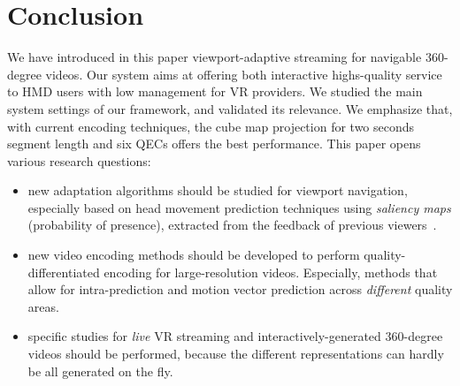 \section{Conclusion}
\label{sec:conclusion}

We have introduced in this paper viewport-adaptive streaming for
navigable $360$-degree videos. Our system aims at offering both
interactive highs-quality service to \ac{HMD} users with low management
for \ac{VR} providers.
We studied the main system
settings of our framework, and validated its relevance.
We emphasize that, with current encoding techniques, the cube
map projection for two seconds segment length and six
\acp{QEC} offers the best performance. This
paper opens various research questions:
\begin{itemize}
  \item new adaptation algorithms should be studied for viewport navigation,
especially based on head movement prediction techniques using \emph{saliency maps} (probability of
presence), extracted from the feedback of
previous viewers~\cite{han2014spatial}.

  \item new video encoding methods should be
developed to perform quality-differentiated encoding for
large-resolution videos. Especially, methods that allow for
intra-prediction and motion vector prediction across \emph{different} quality
areas.
\item specific studies for \emph{live} \ac{VR} streaming
and interactively-generated $360$-degree videos should be performed,
because the different representations can hardly be all
generated on the fly.
\end{itemize}
